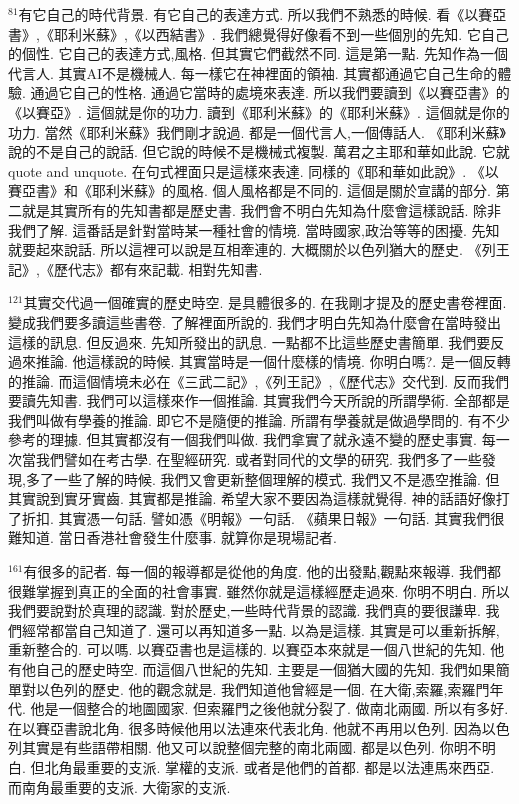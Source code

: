 \documentclass{book}
\begin{document}
$^{81}$有它自己的時代背景.
有它自己的表達方式.
所以我們不熟悉的時候.
看《以賽亞書》,《耶利米蘇》,《以西結書》.
我們總覺得好像看不到一些個別的先知.
它自己的個性.
它自己的表達方式,風格.
但其實它們截然不同.
這是第一點.
先知作為一個代言人.
其實AI不是機械人.
每一樣它在神裡面的領袖.
其實都通過它自己生命的體驗.
通過它自己的性格.
通過它當時的處境來表達.
所以我們要讀到《以賽亞書》的《以賽亞》.
這個就是你的功力.
讀到《耶利米蘇》的《耶利米蘇》.
這個就是你的功力.
當然《耶利米蘇》我們剛才說過.
都是一個代言人,一個傳話人.
《耶利米蘇》說的不是自己的說話.
但它說的時候不是機械式複製.
萬君之主耶和華如此說.
它就quote and unquote.
在句式裡面只是這樣來表達.
同樣的《耶和華如此說》.
《以賽亞書》和《耶利米蘇》的風格.
個人風格都是不同的.
這個是關於宣講的部分.
第二就是其實所有的先知書都是歷史書.
我們會不明白先知為什麼會這樣說話.
除非我們了解.
這番話是針對當時某一種社會的情境.
當時國家,政治等等的困擾.
先知就要起來說話.
所以這裡可以說是互相牽連的.
大概關於以色列猶大的歷史.
《列王記》,《歷代志》都有來記載.
相對先知書.

$^{121}$其實交代過一個確實的歷史時空.
是具體很多的.
在我剛才提及的歷史書卷裡面.
變成我們要多讀這些書卷.
了解裡面所說的.
我們才明白先知為什麼會在當時發出這樣的訊息.
但反過來.
先知所發出的訊息.
一點都不比這些歷史書簡單.
我們要反過來推論.
他這樣說的時候.
其實當時是一個什麼樣的情境.
你明白嗎?.
是一個反轉的推論.
而這個情境未必在《三武二記》,《列王記》,《歷代志》交代到.
反而我們要讀先知書.
我們可以這樣來作一個推論.
其實我們今天所說的所謂學術.
全部都是我們叫做有學養的推論.
即它不是隨便的推論.
所謂有學養就是做過學問的.
有不少參考的理據.
但其實都沒有一個我們叫做.
我們拿實了就永遠不變的歷史事實.
每一次當我們譬如在考古學.
在聖經研究.
或者對同代的文學的研究.
我們多了一些發現,多了一些了解的時候.
我們又會更新整個理解的模式.
我們又不是憑空推論.
但其實說到實牙實齒.
其實都是推論.
希望大家不要因為這樣就覺得.
神的話語好像打了折扣.
其實憑一句話.
譬如憑《明報》一句話.
《蘋果日報》一句話.
其實我們很難知道.
當日香港社會發生什麼事.
就算你是現場記者.

$^{161}$有很多的記者.
每一個的報導都是從他的角度.
他的出發點,觀點來報導.
我們都很難掌握到真正的全面的社會事實.
雖然你就是這樣經歷走過來.
你明不明白.
所以我們要說對於真理的認識.
對於歷史,一些時代背景的認識.
我們真的要很謙卑.
我們經常都當自己知道了.
還可以再知道多一點.
以為是這樣.
其實是可以重新拆解,重新整合的.
可以嗎.
以賽亞書也是這樣的.
以賽亞本來就是一個八世紀的先知.
他有他自己的歷史時空.
而這個八世紀的先知.
主要是一個猶大國的先知.
我們如果簡單對以色列的歷史.
他的觀念就是.
我們知道他曾經是一個.
在大衛,索羅,索羅門年代.
他是一個整合的地圖國家.
但索羅門之後他就分裂了.
做南北兩國.
所以有多好.
在以賽亞書說北角.
很多時候他用以法連來代表北角.
他就不再用以色列.
因為以色列其實是有些語帶相關.
他又可以說整個完整的南北兩國.
都是以色列.
你明不明白.
但北角最重要的支派.
掌權的支派.
或者是他們的首都.
都是以法連馬來西亞.
而南角最重要的支派.
大衛家的支派.
\end{document}
